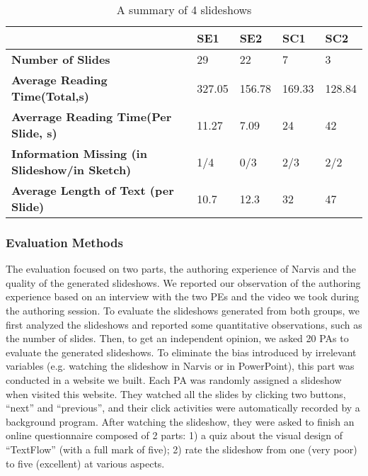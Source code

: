 \begin{table}
  \caption{A summary of 4 slideshows}
  \label{tab:slides1}
  \small
  \centering
  \begin{tabu}{p{2cm}|p{0.9cm}|p{0.9cm}|p{0.9cm}|p{0.9cm}}
  \toprule
 \textbf{} &\textbf{SE1} & \textbf{SE2} & \textbf{SC1}& \textbf{SC2} \\ 
   \midrule
  \textbf{Number of Slides } & 29  & 22 & 7 & 3 \\ 
 \midrule
  \textbf{Average Reading Time(Total,s)} & 327.05 & 156.78 & 169.33 & 128.84\\ 
 \midrule
  \textbf{Averrage Reading Time(Per Slide, s)} & 11.27 & 7.09 &24 & 42\\ 
   \midrule
  \textbf{Information Missing (in Slideshow/in Sketch) }& 1/4 & 0/3 & 2/3 & 2/2\\ 
     \midrule
  \textbf{Average Length of Text (per Slide) }& 10.7 & 12.3 & 32 & 47\\ 
    
  \bottomrule

  \end{tabu}
  \vspace{1mm}
\end{table}

\subsubsection{Evaluation Methods}
The evaluation focused on two parts, the authoring experience of Narvis and the quality of the generated slideshows. We reported our observation of the authoring experience based on an interview with the two PEs and the video we took during the authoring session. 
To evaluate the slideshows generated from both groups, we first analyzed the slideshows and reported some quantitative observations, such as the number of slides.
Then, to get an independent opinion, we asked 20 PAs to evaluate the generated slideshows. To eliminate the bias introduced by irrelevant variables (e.g. watching the slideshow in Narvis or in PowerPoint), this part was conducted in a website we built. Each PA was randomly assigned a slideshow when visited this website. They watched all the slides by clicking two buttons, ``next'' and ``previous'', and their click activities were automatically recorded by a background program.  After watching the slideshow, they were asked to finish an online questionnaire composed of 2 parts: 1) a quiz about the visual design of ``TextFlow'' (with a full mark of five); 2) rate the slideshow from one (very poor) to five (excellent) at various aspects. 





